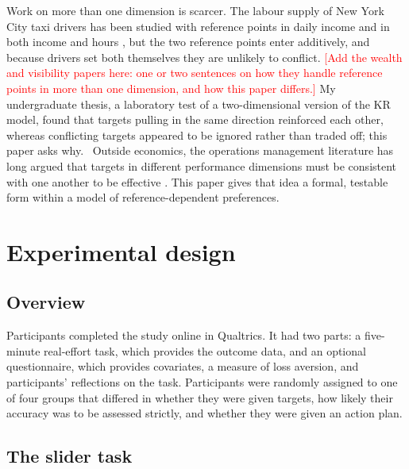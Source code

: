\documentclass[12pt, letterpaper]{article}
\newcommand{\todo}[1]{\textcolor{red}{[#1]}}
\begin{document}
Work on more than one dimension is scarcer. The labour supply of New York City taxi drivers has been studied with reference points in daily income \parencite{camerer.1997.laborsupply,farber.2005.tomorrowanother,farber.2008.referencedependentpreferences} and in both income and hours \parencite{crawford.2011.newyork}, but the two reference points enter additively, and because drivers set both themselves they are unlikely to conflict. \todo{Add the wealth and visibility papers here: one or two sentences on how they handle reference points in more than one dimension, and how this paper differs.} My undergraduate thesis, a laboratory test of a two-dimensional version of the KR model, found that targets pulling in the same direction reinforced each other, whereas conflicting targets appeared to be ignored rather than traded off; this paper asks why.%
\ Outside economics, the operations management literature has long argued that targets in different performance dimensions must be consistent with one another to be effective \parencite[e.g.][]{skinner.1974.focusedfactory,hayes.1984.restoringour,swamidass.2000.focusedfactory}. This paper gives that idea a formal, testable form within a model of reference-dependent preferences.

\section{Experimental design}

\subsection{Overview}

Participants completed the study online in Qualtrics. It had two parts: a five-minute real-effort task, which provides the outcome data, and an optional questionnaire, which provides covariates, a measure of loss aversion, and participants' reflections on the task. Participants were randomly assigned to one of four groups that differed in whether they were given targets, how likely their accuracy was to be assessed strictly, and whether they were given an action plan.

\subsection{The slider task}
\end{document}
